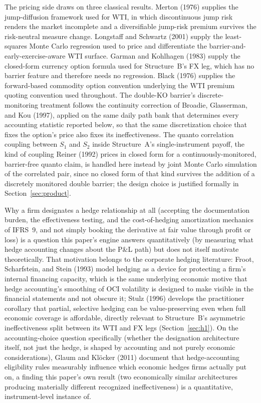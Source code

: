 \documentclass[11pt,a4paper]{article}
\begin{document}
The pricing side draws on three classical results. Merton (1976) supplies the jump-diffusion framework used for WTI, in which discontinuous jump risk renders the market incomplete and a diversifiable jump-risk premium survives the risk-neutral measure change. Longstaff and Schwartz (2001) supply the least-squares Monte Carlo regression used to price and differentiate the barrier-and-early-exercise-aware WTI surface. Garman and Kohlhagen (1983) supply the closed-form currency option formula used for Structure~B's FX leg, which has no barrier feature and therefore needs no regression. Black (1976) supplies the forward-based commodity option convention underlying the WTI premium quoting convention used throughout. The double-KO barrier's discrete-monitoring treatment follows the continuity correction of Broadie, Glasserman, and Kou (1997), applied on the same daily path bank that determines every accounting statistic reported below, so that the same discretization choice that fixes the option's price also fixes its ineffectiveness. The quanto correlation coupling between $S_1$ and $S_2$ inside Structure~A's single-instrument payoff, the kind of coupling Reiner (1992) prices in closed form for a continuously-monitored, barrier-free quanto claim, is handled here instead by joint Monte Carlo simulation of the correlated pair, since no closed form of that kind survives the addition of a discretely monitored double barrier; the design choice is justified formally in Section~\ref{sec:product}.

Why a firm designates a hedge relationship at all (accepting the documentation burden, the effectiveness testing, and the cost-of-hedging amortization mechanics of IFRS~9, and not simply booking the derivative at fair value through profit or loss) is a question this paper's engine answers quantitatively (by measuring what hedge accounting changes about the P\&L path) but does not itself motivate theoretically. That motivation belongs to the corporate hedging literature: Froot, Scharfstein, and Stein (1993) model hedging as a device for protecting a firm's internal financing capacity, which is the same underlying economic motive that hedge accounting's smoothing of OCI volatility is designed to make visible in the financial statements and not obscure it; Stulz (1996) develops the practitioner corollary that partial, selective hedging can be value-preserving even when full economic coverage is affordable, directly relevant to Structure~B's asymmetric ineffectiveness split between its WTI and FX legs (Section~\ref{sec:h1}). On the accounting-choice question specifically (whether the designation architecture itself, not just the hedge, is shaped by accounting and not purely economic considerations), Glaum and Kl\"ocker (2011) document that hedge-accounting eligibility rules measurably influence which economic hedges firms actually put on, a finding this paper's own result (two economically similar architectures producing materially different recognized ineffectiveness) is a quantitative, instrument-level instance of.
\end{document}
